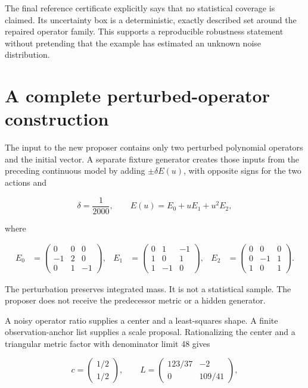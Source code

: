 The final reference certificate explicitly says that no statistical
coverage is claimed. Its uncertainty box is a deterministic, exactly
described set around the repaired operator family. This supports a
reproducible robustness statement without pretending that the example
has estimated an unknown noise distribution.

\section{A complete perturbed-operator construction}\label{LSM:a-complete-perturbed-operator-construction}

The input to the new proposer contains only two perturbed polynomial
operators and the initial vector. A separate fixture generator creates
those inputs from the preceding continuous model by adding
\(\pm\delta E(u)\), with opposite signs for the two actions and

\[
\delta=\frac1{2000},\qquad
E(u)=E_0+uE_1+u^2E_2,
\]

where

\[
\begin{aligned}
E_0&=\begin{pmatrix}0&0&0\\-1&2&0\\0&1&-1\end{pmatrix},&
E_1&=\begin{pmatrix}0&1&-1\\1&0&1\\1&-1&0\end{pmatrix},&
E_2&=\begin{pmatrix}0&0&0\\0&-1&1\\1&0&1\end{pmatrix}.
\end{aligned}
\]

The perturbation preserves integrated mass. It is not a statistical
sample. The proposer does not receive the predecessor metric or a hidden
generator.

A noisy operator ratio supplies a center and a least-squares shape. A
finite observation-anchor list supplies a scale proposal. Rationalizing
the center and a triangular metric factor with denominator limit 48
gives

\[
c=\begin{pmatrix}1/2\\1/2\end{pmatrix},\qquad
L=\begin{pmatrix}123/37&-2\\0&109/41\end{pmatrix},
\]

